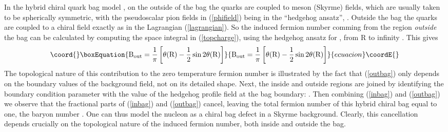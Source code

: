\documentclass[a4paper,prd,showpacs,showkeys]{revtex4}
\begin{document}
{{In the hybrid chiral quark bag model \cite{jaffe,bhaduri}, on the outside of the bag the quarks are coupled to meson (Skyrme) fields, which are usually taken to be spherically symmetric, with the pseudoscalar pion fields in (\ref{phifield}) being in  the ``hedgehog ansatz'',  \coordHE{}. Outside the bag the quarks are coupled to a chiral field exactly as in the Lagrangian (\ref{lagrangian}). So the induced fermion number comming from the region  {\it outside} the bag can be calculated by computing the space integral in (\ref{topcharge}), using the hedgehog ansatz for \coordHE{}, from R to infinity \cite{jaffe}. This gives 
\begin{equation}\coord{}\boxEquation{
\textrm{B}_{\rm{out}}=\frac{1}{\pi}\left[ \theta (\rm{R})-\frac{1}{2} \sin 2 \theta (\rm{R}) \right] 
\label{outbag} 
}{
\textrm{B}_{\rm{out}}=\frac{1}{\pi}\left[ \theta (\rm{R})-\frac{1}{2} \sin 2 \theta (\rm{R}) \right] 
}{ecuacion}\coordE{}\end{equation}
The topological nature of this contribution to the zero temperature fermion number is illustrated by the fact that (\ref{outbag}) only depends on the boundary values of the background field, not on its detailed shape. Next, the inside and outside regions are joined by identifying the boundary condition parameter \myHighlight{$\theta$}\coordHE{} with the value of the hedgehog profile field at the bag boundary: \coordHE{}. 
Then combining (\ref{inbag}) and  (\ref{outbag}) we observe that the fractional parts of (\ref{inbag}) and (\ref{outbag}) cancel,  leaving the total fermion number of this hybrid chiral bag equal to one, the baryon number \cite{jaffe}. One can thus model the nucleon as a chiral bag defect in a Skyrme background. Clearly, this cancellation depends crucially on the topological nature of the induced fermion number, both inside and outside the bag.

}}
\end{document}
